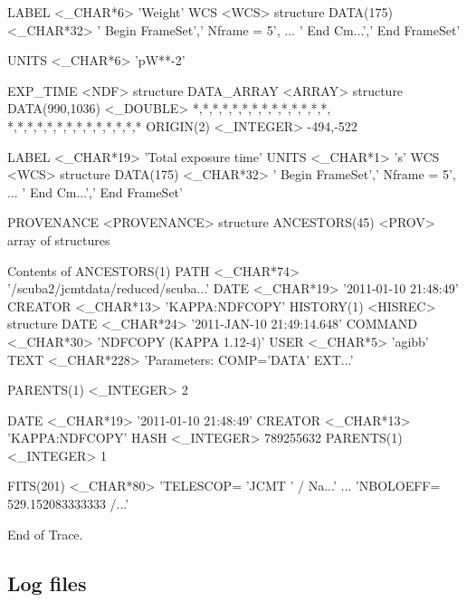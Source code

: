 \documentclass[twoside,11pt,nolof]{starlink}
\begin{document}
\begin{terminalv}
            LABEL          <_CHAR*6>       'Weight'
            WCS            <WCS>           {structure}
               DATA(175)      <_CHAR*32>      ' Begin FrameSet',' Nframe =
5',
                                              ... ' End Cm...',' End
FrameSet'

            UNITS          <_CHAR*6>       'pW**-2'

         EXP_TIME       <NDF>           {structure}
            DATA_ARRAY     <ARRAY>         {structure}
               DATA(990,1036)  <_DOUBLE>      *,*,*,*,*,*,*,*,*,*,*,*,*,*,
                                              *,*,*,*,*,*,*,*,*,*,*,*,*,*
               ORIGIN(2)      <_INTEGER>      -494,-522

            LABEL          <_CHAR*19>      'Total exposure time'
            UNITS          <_CHAR*1>       's'
            WCS            <WCS>           {structure}
               DATA(175)      <_CHAR*32>      ' Begin FrameSet',' Nframe =
5',
                                              ... ' End Cm...',' End
FrameSet'

      PROVENANCE     <PROVENANCE>    {structure}
         ANCESTORS(45)  <PROV>          {array of structures}

         Contents of ANCESTORS(1)
            PATH           <_CHAR*74>
'/scuba2/jcmtdata/reduced/scuba...'
            DATE           <_CHAR*19>      '2011-01-10 21:48:49'
            CREATOR        <_CHAR*13>      'KAPPA:NDFCOPY'
            HISTORY(1)     <HISREC>        {structure}
               DATE           <_CHAR*24>      '2011-JAN-10 21:49:14.648'
               COMMAND        <_CHAR*30>      'NDFCOPY         (KAPPA
1.12-4)'
               USER           <_CHAR*5>       'agibb'
               TEXT           <_CHAR*228>     'Parameters: COMP='DATA'
EXT...'

            PARENTS(1)     <_INTEGER>      2

         DATE           <_CHAR*19>      '2011-01-10 21:48:49'
         CREATOR        <_CHAR*13>      'KAPPA:NDFCOPY'
         HASH           <_INTEGER>      789255632
         PARENTS(1)     <_INTEGER>      1

      FITS(201)      <_CHAR*80>      'TELESCOP= 'JCMT    '           / Na...'
                                     ... 'NBOLOEFF=     529.152083333333
/...'

End of Trace.
\end{terminalv}

\subsection{Log files}
\end{document}

